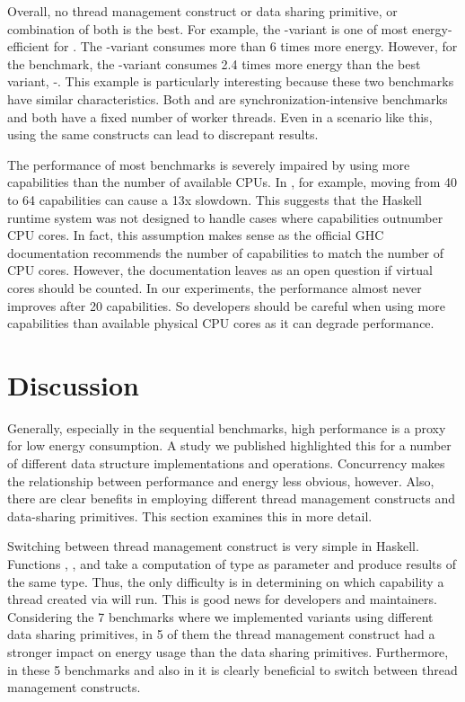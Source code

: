  Overall, no thread management construct or data sharing primitive, or combination of both is the best. For example, the \forkIO-\TMVar variant is one of most energy-efficient for \dining. The \forkOS-\TMVar variant consumes more than 6 times more energy. However, for the \chameneos benchmark, the \forkIO-\TMVar variant consumes 2.4 times more energy than the best variant, \forkIO-\MVar. This example is particularly interesting because these two benchmarks have similar characteristics. Both \dining and \chameneos are synchronization-intensive benchmarks and both have a fixed number of worker threads. Even in a scenario like this, using the same constructs can lead to discrepant results.
\newline

 The performance of most benchmarks is severely impaired by using more capabilities than the number of available CPUs. In \chameneos, for example, moving from 40 to 64 capabilities can cause a 13x slowdown. This suggests that the Haskell runtime system was not designed to handle cases where capabilities outnumber CPU cores. In fact, this assumption makes sense as the official GHC documentation recommends the number of capabilities to match the number of CPU cores. However, the documentation leaves as an open question if virtual cores should be counted. In our experiments, the performance almost never improves after 20 capabilities. So developers should be careful when using more capabilities than available physical CPU cores as it can degrade performance.


\section{Discussion}\label{sec:discussion}
Generally, especially in the sequential benchmarks, high performance is a proxy for low energy consumption. A study we published \citep{lima:2016} highlighted this for a number of different data structure implementations and operations. Concurrency makes the relationship between performance and energy less obvious, however. Also, there are clear benefits in employing  different thread management constructs and data-sharing primitives. This section examines this in more detail.

Switching between thread management construct is very simple in Haskell. Functions \forkOn, \forkIO, and \forkOS take a computation of type \IO as parameter and produce results of the same type. Thus, the only difficulty is in determining on which capability a thread created via \forkOn will run. This is good news for developers and maintainers. Considering the 7 benchmarks where we implemented variants using different data sharing primitives, in 5 of them the thread management construct had a stronger impact on energy usage than the data sharing primitives. Furthermore, in these 5 benchmarks and also in \warp it is clearly beneficial to switch between thread management constructs.

